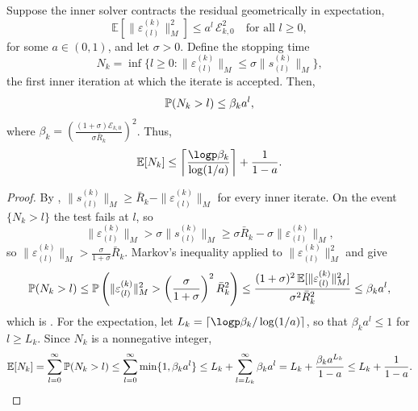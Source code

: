 \documentclass[11pt]{article}
\begin{document}
\begin{theorem}\label{thm:stopping-time}
    Suppose the inner solver contracts the residual geometrically in expectation,
    \begin{equation}\label{eq:inner-contraction}
        \mathbb{E}\left[\|\varepsilon^{(k)}_{(l)}\|^2_M\right] \leq a^l\,\mathcal{E}_{k,0}^2 \quad\text{for all } l \geq 0,
    \end{equation}
    for some $a \in (0, 1)$, and let $\sigma > 0$.
    Define the stopping time
    \begin{equation*}
        N_k = \inf\{l \geq 0 : \|\varepsilon^{(k)}_{(l)}\|_M \leq \sigma\|s^{(k)}_{(l)}\|_M\},
    \end{equation*}
    the first inner iteration at which the iterate is accepted.
    Then,
    \begin{equation}\label{eq:stopping-time-probability-bound}
        \mathbb{P}(N_k > l) \leq \beta_k a^l,
    \end{equation}
    where $ \beta_k = \left(\frac{(1 + \sigma)\mathcal{E}_{k,0}}{\sigma \bar{R}_k}\right)^2$.
    Thus,
    \begin{equation}\label{eq:stopping-time-expectation-bound}
        \mathbb{E}[N_k] \leq \left\lceil \frac{\logp\beta_k}{\log (1/a)} \right\rceil + \frac{1}{1-a}.
    \end{equation}
\end{theorem}
\begin{proof}
    By , $\|s^{(k)}_{(l)}\|_M \geq \bar R_k - \|\varepsilon^{(k)}_{(l)}\|_M$ for every inner iterate.
    On the event $\{N_k > l\}$ the test fails at $l$, so
    \begin{equation*}
        \|\varepsilon^{(k)}_{(l)}\|_M > \sigma\|s^{(k)}_{(l)}\|_M \geq \sigma\bar R_k - \sigma\|\varepsilon^{(k)}_{(l)}\|_M,
    \end{equation*}
    so $\|\varepsilon^{(k)}_{(l)}\|_M > \frac{\sigma}{1 + \sigma}\bar R_k$.
    Markov's inequality applied to $\|\varepsilon^{(k)}_{(l)}\|^2_M$ and  give
    \begin{equation*}
        \mathbb{P}(N_k > l) \leq \mathbb{P}\left(\|\varepsilon^{(k)}_{(l)}\|^2_M > \left(\frac{\sigma}{1+\sigma}\right)^2 \bar R_k^2\right)
        \leq \frac{(1+\sigma)^2\,\mathbb{E}[\|\varepsilon^{(k)}_{(l)}\|^2_M]}{\sigma^2 \bar R_k^2}
        \leq \beta_k a^l,
    \end{equation*}
    which is .
    For the expectation, let $L_k = \lceil \logp\beta_k / \log(1/a) \rceil$, so that $\beta_k a^{l} \leq 1$ for $l \geq L_k$.
    Since $N_k$ is a nonnegative integer,
    \begin{equation*}
        \mathbb{E}[N_k] = \sum_{l=0}^\infty \mathbb{P}(N_k>l) \leq \sum_{l=0}^\infty \min\{1,\beta_k a^l\}
        \leq L_k + \sum_{l = L_k}^{\infty} \beta_k a^l = L_k + \frac{\beta_k a^{L_k}}{1-a} \leq L_k + \frac{1}{1-a}.
    \end{equation*}
\end{proof}
\end{document}
